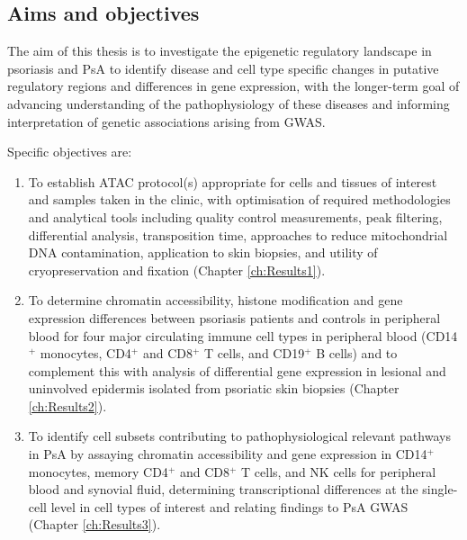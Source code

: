 \subsection{Aims and objectives}

The aim of this thesis is to investigate the epigenetic regulatory landscape in psoriasis and PsA to identify disease and cell type specific changes in putative regulatory regions and differences in gene expression, with the longer-term goal of advancing understanding of the pathophysiology of these diseases and informing interpretation of genetic associations arising from GWAS. 

Specific objectives are:
\begin{enumerate}

\item To establish ATAC protocol(s) appropriate for cells and tissues of interest and samples taken in the clinic, with optimisation of required methodologies and analytical tools including quality control measurements, peak filtering, differential analysis, transposition time, approaches to reduce mitochondrial DNA contamination, application to skin biopsies, and utility of cryopreservation and fixation (Chapter \ref{ch:Results1}).

\item To determine  chromatin  accessibility, histone modification  and gene expression differences between psoriasis patients and controls in peripheral blood for four major circulating immune cell types in peripheral blood (CD14$^+$ monocytes, CD4$^+$ and CD8$^+$ T cells, and CD19$^+$ B cells) and to complement this with analysis of differential gene expression in lesional and uninvolved epidermis isolated from psoriatic skin biopsies (Chapter \ref{ch:Results2}).

\item To identify cell subsets contributing to pathophysiological relevant pathways in PsA by assaying chromatin accessibility and gene expression in CD14$^+$ monocytes, memory CD4$^+$ and CD8$^+$ T cells, and NK cells for peripheral blood and synovial fluid, determining transcriptional differences at the single-cell level in cell types of interest and relating findings to PsA GWAS (Chapter \ref{ch:Results3}).

\end{enumerate}
